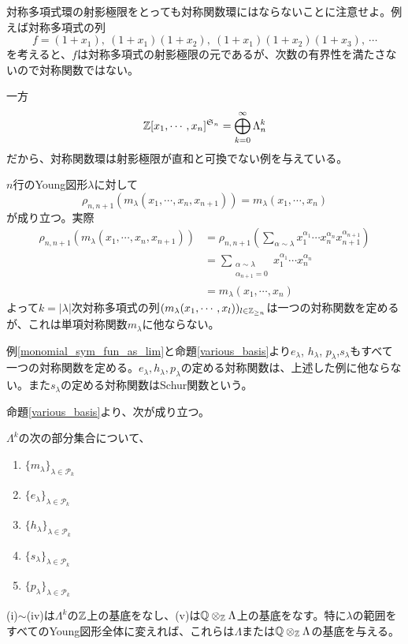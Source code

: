 \documentclass{ltjsreport}
\begin{document}
\begin{notice}
  対称多項式環の射影極限をとっても対称関数環にはならないことに注意せよ。例えば対称多項式の列
  \[
    f=(1+x_1),\:(1+x_1)(1+x_2),\:(1+x_1)(1+x_2)(1+x_3),\:\cdots
  \]
  を考えると、$f$は対称多項式の射影極限の元であるが、次数の有界性を満たさないので対称関数ではない。

  一方
  \[
  \mathbb{Z}[x_1,\cdots,x_n]^{\mathfrak{S}_n}=\bigoplus_{k=0}^\infty \Lambda^k_n  
  \]
  だから、対称関数環は射影極限が直和と可換でない例を与えている。
\end{notice}


\begin{eg}\label{monomial_sym_fun_as_lim}
  $n$行のYoung図形$\lambda$に対して
  \[
  \rho_{n,n+1}(m_\lambda(x_1,\cdots,x_n,x_{n+1}))=m_\lambda(x_1,\cdots,x_n)  
  \]
  が成り立つ。実際
  \begin{align*}
    \rho_{n,n+1}(m_\lambda(x_1,\cdots,x_n,x_{n+1}))
    &=\rho_{n,n+1}\left(
      \sum_{\alpha\sim\lambda}x_1^{\alpha_1}\cdots x_n^{\alpha_n}x_{n+1}^{\alpha_{n+1}}
      \right)\\
    &=\sum_{\substack{\alpha\sim\lambda \\ \alpha_{n+1}=0}}x_1^{\alpha_1}\cdots x_n^{\alpha_n}\\
    &=m_\lambda(x_1,\cdots,x_n)
  \end{align*}
  よって$k=|\lambda|$次対称多項式の列$(m_\lambda(x_1,\cdots,x_l))_{l\in\mathbb{Z}_{\geq n}}$は一つの対称関数を定めるが、これは単項対称関数$m_\lambda$に他ならない。
\end{eg}

\begin{eg}
  例\ref{monomial_sym_fun_as_lim}と命題\ref{various_basis}より$e_\lambda$, $h_\lambda$, $p_\lambda$,$s_\lambda$もすべて一つの対称関数を定める。$e_\lambda,h_\lambda,p_\lambda$の定める対称関数は、上述した例に他ならない。また$s_\lambda$の定める対称関数はSchur関数という。
\end{eg}

命題\ref{various_basis}より、次が成り立つ。

\begin{prop}\label{various_symfunc_basis}
  $\Lambda^k$の次の部分集合について、
  \begin{enumerate}
    \item $\{m_\lambda\}_{\lambda\in\mathcal{P}_k}$
    \item $\{e_\lambda\}_{\lambda\in\mathcal{P}_k}$
    \item $\{h_\lambda\}_{\lambda\in\mathcal{P}_k}$
    \item $\{s_\lambda\}_{\lambda\in\mathcal{P}_k}$
    \item $\{p_\lambda\}_{\lambda\in\mathcal{P}_k}$
  \end{enumerate}
  (i)$\sim$(iv)は$\Lambda^k$の$\mathbb{Z}$上の基底をなし、(v)は$\mathbb{Q}\otimes_{\mathbb{Z}}{\Lambda}$上の基底をなす。特に$\lambda$の範囲をすべてのYoung図形全体に変えれば、これらは$\Lambda$または$\mathbb{Q}\otimes_{\mathbb{Z}}{\Lambda}$の基底を与える。
\end{prop}
\end{document}
